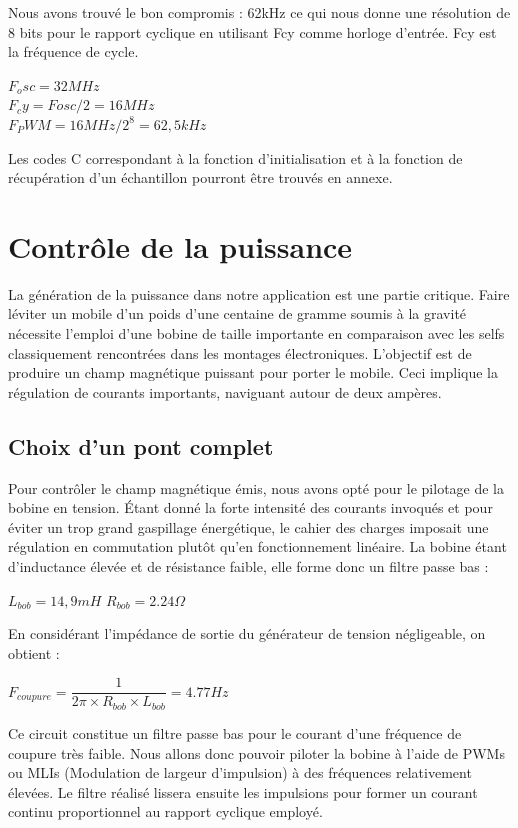 \documentclass[11pt, french]{article} %
\begin{document}
Nous avons trouvé le bon compromis : 62kHz ce qui nous donne une résolution de 8 bits pour le rapport cyclique en utilisant Fcy comme horloge d'entrée. Fcy est la fréquence de cycle.
\begin{center}
$F_osc = 32MHz$
\\$F_cy = Fosc/2 = 16MHz$
\\$F_PWM = 16MHz/2^8 = 62,5kHz$
\end{center}
\vspace{0.5cm}

Les codes C correspondant à la fonction d'initialisation et à la fonction de récupération d'un échantillon pourront être trouvés en annexe. 

\section{Contrôle de la puissance}

	La génération de la puissance dans notre application est une partie critique. Faire léviter un mobile d'un poids d'une centaine de gramme soumis à la gravité nécessite l'emploi d'une bobine de taille importante en comparaison avec les selfs classiquement rencontrées dans les montages électroniques. L'objectif est de produire un champ magnétique puissant pour porter le mobile. Ceci implique la régulation de courants importants, naviguant autour de deux ampères. 

\subsection{Choix d'un pont complet}
	Pour contrôler le champ magnétique émis, nous avons opté pour le pilotage de la bobine en tension. Étant donné la forte intensité des courants invoqués et pour éviter un trop grand gaspillage énergétique, le cahier des charges imposait une régulation en commutation plutôt qu'en fonctionnement linéaire. La bobine étant d'inductance élevée et de résistance faible, elle forme donc un filtre passe bas :

\medskip
$ L_{bob} = 14,9 mH $
$ R_{bob} = 2.24 \Omega $

\medskip
En considérant l'impédance de sortie du générateur de tension négligeable, on obtient :

$ F_{coupure} = \dfrac{1}{2\pi \times R_{bob} \times L_{bob}} = 4.77 Hz $

\medskip
Ce circuit constitue un filtre passe bas pour le courant d'une fréquence de coupure très faible. Nous allons donc pouvoir piloter la bobine à l'aide de PWMs ou MLIs (Modulation de largeur d'impulsion) à des fréquences relativement élevées. Le filtre réalisé lissera ensuite les impulsions pour former un courant continu proportionnel au rapport cyclique employé.
\end{document}
